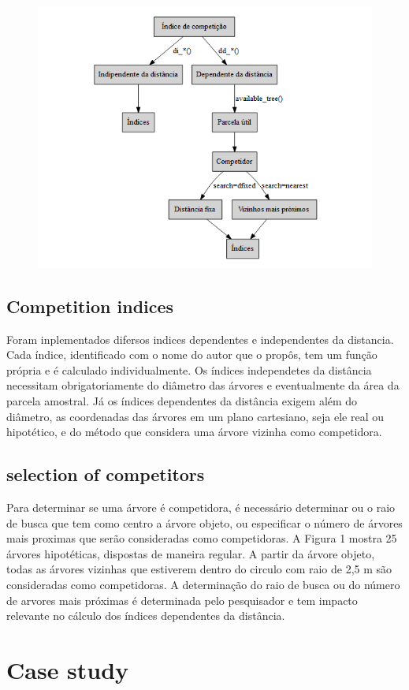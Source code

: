 \documentclass[article]{jss}
\begin{document}
\begin{figure}[htbp]
\centering
\includegraphics{../workflow.png}
\caption{}
\end{figure}

\subsection{Competition indices}\label{competition-indices}

Foram inplementados difersos indices dependentes e independentes da
distancia. Cada índice, identificado com o nome do autor que o propôs,
tem um função própria e é calculado individualmente. Os índices
independetes da distância necessitam obrigatoriamente do diâmetro das
árvores e eventualmente da área da parcela amostral. Já os índices
dependentes da distância exigem além do diâmetro, as coordenadas das
árvores em um plano cartesiano, seja ele real ou hipotético, e do método
que considera uma árvore vizinha como competidora.

\subsection{selection of competitors}\label{selection-of-competitors}

Para determinar se uma árvore é competidora, é necessário determinar ou
o raio de busca que tem como centro a árvore objeto, ou especificar o
número de árvores mais proximas que serão consideradas como
competidoras. A Figura 1 mostra 25 árvores hipotéticas, dispostas de
maneira regular. A partir da árvore objeto, todas as árvores vizinhas
que estiverem dentro do circulo com raio de 2,5 m são consideradas como
competidoras. A determinação do raio de busca ou do número de arvores
mais próximas é determinada pelo pesquisador e tem impacto relevante no
cálculo dos índices dependentes da distância.

\section{Case study}\label{case-study}
\end{document}
